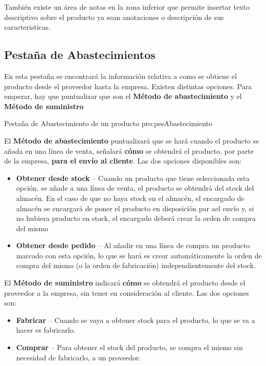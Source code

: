 También existe un área de notas en la zona inferior que permite insertar texto descriptivo sobre el producto ya sean anotaciones o descripción de sus caracteristicas.


\subsection{Pestaña de Abastecimientos}

En esta pestaña se encontrará la información relativa a como se obtiene el producto desde el proveedor hasta la empresa. Existen distintas opciones. Para empezar, hay que puntualizar que son el \textbf{Método de abastecimiento} y el \textbf{Método de suministro}

{Pestaña de Abastecimiento de un producto}
{pro:pesAbastecimiento}

El \textbf{Método de abastecimiento} puntualizará que se hará cuando el producto se añada en una línea de venta, señalará \textbf{cómo} se obtendrá el producto, por parte de la empresa, \textbf{para el envío al cliente}. Las dos opciones disponibles son:

\begin{itemize}
  \item \textbf{Obtener desde stock} -- Cuando un producto que tiene seleccionada esta opción, se añade a una línea de venta, el producto
               se obtendrá del stock del almacén. En el caso de que no haya stock en el almacén, el encargado de almacén se encargará de
               poner el producto en disposición par ael envío y, si no hubiera producto en stock, el encargado deberá crear la orden de
               compra del mismo
  \item \textbf{Obtener desde pedido} -- Al añadir en una línea de compra un producto marcado con esta opción, lo que se hará es crear
               automáticamente la orden de compra del mismo (o la orden de fabricación) independientemente del stock. 
\end{itemize}

El \textbf{Método de suministro} indicará \textbf{cómo} se obtendrá el producto desde el proveedor a la empresa, sin tener en consideración al cliente. Las dos opciones son:

\begin{itemize}
  \item \textbf{Fabricar} -- Cuando se vaya a obtener stock para el producto, lo que se va a hacer es fabricarlo.
  \item \textbf{Comprar} -- Para obtener el stock del producto, se compra el mismo sin necesidad de fabricarlo, a un proveedor.
\end{itemize}


